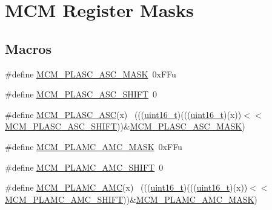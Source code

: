 \hypertarget{group___m_c_m___register___masks}{}\section{M\+CM Register Masks}
\label{group___m_c_m___register___masks}
\subsection*{Macros}
\begin{DoxyCompactItemize}
\item 
\#define \hyperlink{group___m_c_m___register___masks_ga215cf860c41174735020a34e7ccf9590}{M\+C\+M\+\_\+\+P\+L\+A\+S\+C\+\_\+\+A\+S\+C\+\_\+\+M\+A\+SK}~0x\+F\+Fu
\item 
\#define \hyperlink{group___m_c_m___register___masks_ga88f833168fd51e1b3c950e21b00bbfc3}{M\+C\+M\+\_\+\+P\+L\+A\+S\+C\+\_\+\+A\+S\+C\+\_\+\+S\+H\+I\+FT}~0
\item 
\#define \hyperlink{group___m_c_m___register___masks_gadbabfd7e827544257764056bbc98fd34}{M\+C\+M\+\_\+\+P\+L\+A\+S\+C\+\_\+\+A\+SC}(x)                                              ~(((\hyperlink{_p_e___types_8h_a1f1825b69244eb3ad2c7165ddc99c956}{uint16\+\_\+t})(((\hyperlink{_p_e___types_8h_a1f1825b69244eb3ad2c7165ddc99c956}{uint16\+\_\+t})(x))$<$$<$\hyperlink{group___m_c_m___register___masks_ga88f833168fd51e1b3c950e21b00bbfc3}{M\+C\+M\+\_\+\+P\+L\+A\+S\+C\+\_\+\+A\+S\+C\+\_\+\+S\+H\+I\+FT}))\&\hyperlink{group___m_c_m___register___masks_ga215cf860c41174735020a34e7ccf9590}{M\+C\+M\+\_\+\+P\+L\+A\+S\+C\+\_\+\+A\+S\+C\+\_\+\+M\+A\+SK})
\item 
\#define \hyperlink{group___m_c_m___register___masks_ga7988227df54012705c7f522f348214ee}{M\+C\+M\+\_\+\+P\+L\+A\+M\+C\+\_\+\+A\+M\+C\+\_\+\+M\+A\+SK}~0x\+F\+Fu
\item 
\#define \hyperlink{group___m_c_m___register___masks_gaa1b3153d0bf749f80fffacd948dd4bd4}{M\+C\+M\+\_\+\+P\+L\+A\+M\+C\+\_\+\+A\+M\+C\+\_\+\+S\+H\+I\+FT}~0
\item 
\#define \hyperlink{group___m_c_m___register___masks_ga62d94ee71c272adf6c5a19fad692672c}{M\+C\+M\+\_\+\+P\+L\+A\+M\+C\+\_\+\+A\+MC}(x)                                              ~(((\hyperlink{_p_e___types_8h_a1f1825b69244eb3ad2c7165ddc99c956}{uint16\+\_\+t})(((\hyperlink{_p_e___types_8h_a1f1825b69244eb3ad2c7165ddc99c956}{uint16\+\_\+t})(x))$<$$<$\hyperlink{group___m_c_m___register___masks_gaa1b3153d0bf749f80fffacd948dd4bd4}{M\+C\+M\+\_\+\+P\+L\+A\+M\+C\+\_\+\+A\+M\+C\+\_\+\+S\+H\+I\+FT}))\&\hyperlink{group___m_c_m___register___masks_ga7988227df54012705c7f522f348214ee}{M\+C\+M\+\_\+\+P\+L\+A\+M\+C\+\_\+\+A\+M\+C\+\_\+\+M\+A\+SK})

\end{DoxyCompactItemize}
